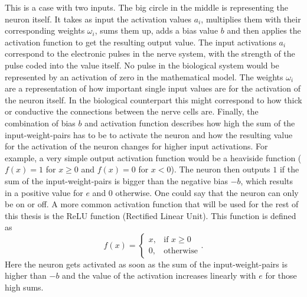 This is a case with two inputs. The big circle in the middle is representing the neuron itself. It takes as input the activation values $a_i$, multiplies them with their corresponding weights $\omega_i$, sums them up, adds a bias value $b$ and then applies the activation function to get the resulting output value. The input activations $a_i$ correspond to the electronic pulses in the nerve system, with the strength of the pulse coded into the value itself. No pulse in the biological system would be represented by an activation of zero in the mathematical model. The weights $\omega_i$ are a representation of how important single input values are for the activation of the neuron itself. In the biological counterpart this might correspond to how thick or conductive the connections between the nerve cells are. Finally, the combination of bias $b$ and activation function describes how high the sum of the input-weight-pairs has to be to activate the neuron and how the resulting value for the activation of the neuron changes for higher input activations. For example, a very simple output activation function would be a heaviside function ($f(x) = 1$ for $x\geq0$ and $f(x) = 0$ for $x<0$). The neuron then outputs $1$ if the sum of the input-weight-pairs is bigger than the negative bias $-b$, which results in a positive value for $e$ and $0$ otherwise. One could say that the neuron can only be on or off. A more common activation function that will be used for the rest of this thesis is the ReLU function (Rectified Linear Unit). This function is defined as 
\begin{equation}
	f(x) = 
	\begin{cases}
		x, &\text{if } x\geq0 \\
		0, &\text{otherwise}
	\end{cases}.
\end{equation}
Here the neuron gets activated as soon as the sum of the input-weight-pairs is higher than $-b$ and the value of the activation increases linearly with $e$ for those high sums.
